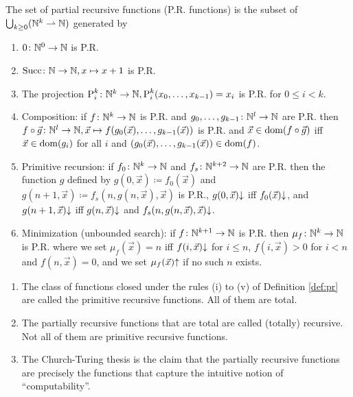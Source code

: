 \begin{boxdefi}\label{def:pr}
    The set of \alert{partial recursive functions (P.R. functions)} is the subset of $\bigcup_{k \ge 0}(\mathbb{N}^k \rightharpoonup \mathbb{N})$ generated by
    \begin{enumerate}
        \item $0 \colon \mathbb{N}^0 \to \mathbb{N}$ is P.R.
        \item $\text{Succ} \colon \mathbb{N} \to \mathbb{N}, x \mapsto x + 1$ is P.R.
        \item The projection $\text{P}_{i}^{k} \colon \mathbb{N}^k \to \mathbb{N},  \text{P}_{i}^{k}(x_0, \dots, x_{k-1}) = x_i$ is P.R. for $0 \le i < k$.
        \item Composition: if $f \colon \mathbb{N}^k \to \mathbb{N}$ is P.R. and $g_0, \dots, g_{k-1} \colon \mathbb{N}^l \to \mathbb{N}$ are P.R. then $f \circ \vec{g} \colon \mathbb{N}^l \to \mathbb{N}, \vec{x} \mapsto f(g_0(\vec{x}), \dots, g_{k-1}(\vec{x}))$ is P.R. and $\vec{x} \in \mathrm{dom}(f \circ \vec{g})$ iff $\vec{x} \in \mathrm{dom}(g_i)$ for all $i$ and $(g_0(\vec{x}), \dots, g_{k-1}(\vec{x})) \in \mathrm{dom}(f)$.
    \item Primitive recursion: if $f_0 \colon \mathbb{N}^k \to \mathbb{N}$ and $f_s \colon \mathbb{N}^{k+2} \to \mathbb{N}$ are P.R. then the function $g$ defined by $g(0, \vec{x}) \coloneq f_0(\vec{x})$ and $g(n+1, \vec{x}) \coloneq f_s(n, g(n, \vec{x}), \vec{x})$ is P.R., $g(0, \vec{x}){\downarrow}$ iff $f_0(\vec{x}){\downarrow}$, and $g(n + 1, \vec{x}){\downarrow}$ iff $g(n, \vec{x}){\downarrow}$ and $f_s(n, g(n, \vec{x}), \vec{x}){\downarrow}$.
    \item Minimization (unbounded search): if $f \colon \mathbb{N}^{k + 1} \to \mathbb{N}$ is P.R. then $\mu_f \colon \mathbb{N}^k \to \mathbb{N}$ is P.R. where we set $\mu_f(\vec{x}) = n$ iff $f(i, \vec{x}){\downarrow}$ for $i \le n$, $f(i, \vec{x}) > 0$ for $i < n$ and $f(n, \vec{x}) = 0$, and we set $\mu_f(\vec{x}){\uparrow}$ if no such $n$ exists.
    \end{enumerate}
\end{boxdefi}

\begin{rem}
    \hfill
    \begin{enumerate}
        \item The class of functions closed under the rules (i) to (v) of Definition \ref{def:pr} are called the \alert{primitive recursive functions}. All  of them are total.
        \item The partially recursive functions that are total are called \alert{(totally) recursive}. Not all of them are primitive recursive functions.
        \item The Church-Turing thesis is the claim that the partially recursive functions are precisely the functions that capture the intuitive notion of ``computability''.
    \end{enumerate}
\end{rem}

